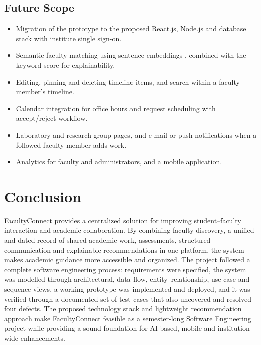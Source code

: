 \documentclass[conference]{IEEEtran}
\begin{document}
\subsection{Future Scope}
\begin{itemize}
  \item Migration of the prototype to the proposed React.js, Node.js and database stack with institute single sign-on.
  \item Semantic faculty matching using sentence embeddings \cite{reimers}, combined with the keyword score for explainability.
  \item Editing, pinning and deleting timeline items, and search within a faculty member's timeline.
  \item Calendar integration for office hours and request scheduling with accept/reject workflow.
  \item Laboratory and research-group pages, and e-mail or push notifications when a followed faculty member adds work.
  \item Analytics for faculty and administrators, and a mobile application.
\end{itemize}

\section{Conclusion}

FacultyConnect provides a centralized solution for improving student--faculty interaction and academic collaboration. By combining faculty discovery, a unified and dated record of shared academic work, assessments, structured communication and explainable recommendations in one platform, the system makes academic guidance more accessible and organized. The project followed a complete software engineering process: requirements were specified, the system was modelled through architectural, data-flow, entity--relationship, use-case and sequence views, a working prototype was implemented and deployed, and it was verified through a documented set of test cases that also uncovered and resolved four defects. The proposed technology stack and lightweight recommendation approach make FacultyConnect feasible as a semester-long Software Engineering project while providing a sound foundation for AI-based, mobile and institution-wide enhancements.
\end{document}
